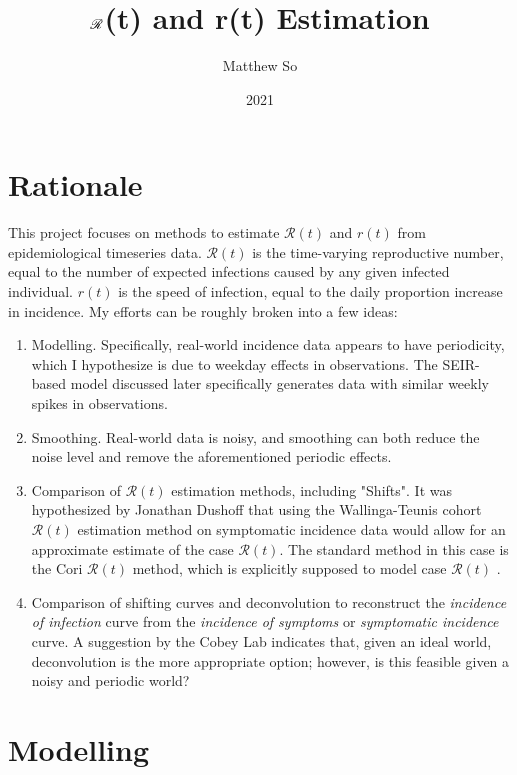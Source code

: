 \documentclass{article}
\title{$\nR$(t) and r(t) Estimation}
\author{Matthew So}
\date{2021}
\newcommand{\nR}{\mathscr{R}}
\begin{document}
\maketitle



\tableofcontents

\section{Rationale}
This project focuses on methods to estimate $\nR(t)$ and $r(t)$ from epidemiological timeseries data. $\nR(t)$ is the time-varying reproductive number, equal to the number of expected infections caused by any given infected individual. $r(t)$ is the speed of infection, equal to the daily proportion increase in incidence. My efforts can be roughly broken into a few ideas:

\begin{enumerate}
    \item Modelling. Specifically, real-world incidence data appears to have periodicity, which I hypothesize is due to weekday effects in observations. The SEIR-based model discussed later specifically generates data with similar weekly spikes in observations.
    \item Smoothing. Real-world data is noisy, and smoothing can both reduce the noise level and remove the aforementioned periodic effects. 
    \item Comparison of $\nR(t)$ estimation methods, including "Shifts". It was hypothesized by Jonathan Dushoff \cite{DushoffHypothesis} that using the Wallinga-Teunis \cite{WallingaTeunis} cohort $\nR(t)$ estimation method on symptomatic incidence data would allow for an approximate estimate of the case $\nR(t)$. The standard method in this case is the Cori $\nR(t)$ method, which is explicitly supposed to model case $\nR(t)$ \cite{Cori}.
    \item Comparison of shifting curves and deconvolution to reconstruct the \textit{incidence of infection} curve from the \textit{incidence of symptoms} or \textit{symptomatic incidence} curve. A suggestion by the Cobey Lab \cite{Gostic} indicates that, given an ideal world, deconvolution is the more appropriate option; however, is this feasible given a noisy and periodic world? 
\end{enumerate}


\section{Modelling}
\end{document}
